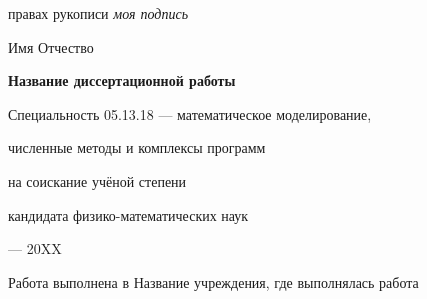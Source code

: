 \newcommand{\sfs}{\fontsize{14pt}{15pt}\selectfont}
\sfs %
\thispagestyle{empty}

\vspace{10mm}
\begin{flushright}
   правах рукописи
  \textit{моя подпись}
\end{flushright}

\vspace{30mm}
\begin{center}
{\Large{} Имя Отчество}
\end{center}

\vspace{30mm}
\begin{center}
{\bf \LARGE Название диссертационной работы
\par}

\vspace{30mm}
{\Large
Специальность 05.13.18 --- математическое моделирование,\par
численные методы и комплексы программ
}

\vspace{15mm}
\par
{} на соискание учёной степени\par
кандидата физико-математических наук
\end{center}

\vspace{40mm}
\begin{center}
{ --- 20XX}
\end{center}

\newpage
\thispagestyle{empty}
\noindent Работа выполнена в Название учреждения, где выполнялась работа

